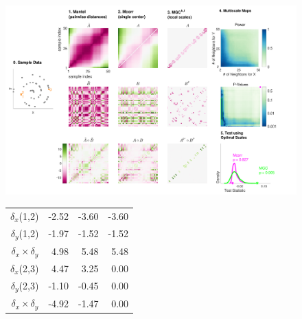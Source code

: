 \documentclass[11pt]{article}
\begin{document}
\begin{figure}[htbp]
\vspace{-50pt}
\includegraphics[width=1.0\textwidth,trim={0 0 1cm 0},clip]{Figures/FigA}
\setlength{\tabcolsep}{10pt} %
\begin{tabular}{r  r   r   r}
 $\delta_x$(1,2)   & \hspace{1.5em} \color{magenta}-2.52  & \hspace{3.5em} \color{magenta}-3.60  &  \hspace{3.0em} \color{magenta}-3.60  \\ 
 $\delta_y$(1,2) & \color{magenta}-1.97 & \color{magenta}-1.52 & \color{magenta}-1.52  \\ 
 $\delta_x \times \delta_y$ & \color{green}4.98 & \color{green}5.48 & \color{green}5.48  \\ 
 
\hline

 $\delta_x$(2,3) & \color{green}4.47 & \color{green}3.25 & 0.00  \\ 
 $\delta_y$(2,3) &  \color{magenta}-1.10 & \color{magenta}-0.45 & 0.00  \\ 
 $\delta_x \times \delta_y$ & \color{magenta}-4.92 & \color{magenta}-1.47 & 0.00  \\ 


\end{tabular}
\end{figure}
\end{document}

